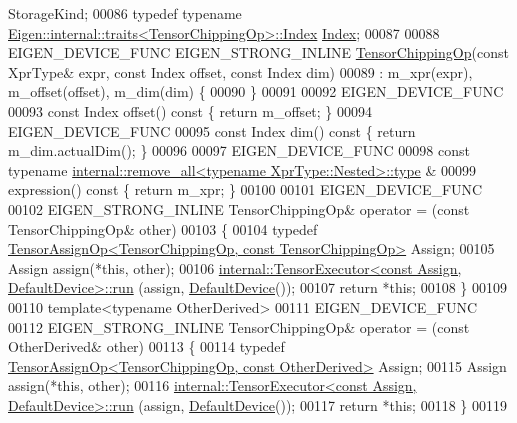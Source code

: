 \begin{DoxyCode}
       StorageKind;
00086   \textcolor{keyword}{typedef} \textcolor{keyword}{typename} \hyperlink{struct_eigen_1_1internal_1_1traits}{Eigen::internal::traits<TensorChippingOp>::Index}
       \hyperlink{namespace_eigen_a62e77e0933482dafde8fe197d9a2cfde}{Index};
00087 
00088   EIGEN\_DEVICE\_FUNC EIGEN\_STRONG\_INLINE \hyperlink{class_eigen_1_1_tensor_chipping_op}{TensorChippingOp}(\textcolor{keyword}{const} XprType& expr, \textcolor{keyword}{const} Index 
      offset, \textcolor{keyword}{const} Index dim)
00089       : m\_xpr(expr), m\_offset(offset), m\_dim(dim) \{
00090   \}
00091 
00092   EIGEN\_DEVICE\_FUNC
00093   \textcolor{keyword}{const} Index offset()\textcolor{keyword}{ const }\{ \textcolor{keywordflow}{return} m\_offset; \}
00094   EIGEN\_DEVICE\_FUNC
00095   \textcolor{keyword}{const} Index dim()\textcolor{keyword}{ const }\{ \textcolor{keywordflow}{return} m\_dim.actualDim(); \}
00096 
00097   EIGEN\_DEVICE\_FUNC
00098   \textcolor{keyword}{const} \textcolor{keyword}{typename} \hyperlink{group___sparse_core___module}{internal::remove\_all<typename XprType::Nested>::type}
      &
00099   expression()\textcolor{keyword}{ const }\{ \textcolor{keywordflow}{return} m\_xpr; \}
00100 
00101   EIGEN\_DEVICE\_FUNC
00102   EIGEN\_STRONG\_INLINE TensorChippingOp& operator = (\textcolor{keyword}{const} TensorChippingOp& other)
00103   \{
00104     \textcolor{keyword}{typedef} \hyperlink{class_eigen_1_1_tensor_assign_op}{TensorAssignOp<TensorChippingOp, const TensorChippingOp>}
       Assign;
00105     Assign assign(*\textcolor{keyword}{this}, other);
00106     \hyperlink{class_eigen_1_1internal_1_1_tensor_executor}{internal::TensorExecutor<const Assign, DefaultDevice>::run}
      (assign, \hyperlink{struct_eigen_1_1_default_device}{DefaultDevice}());
00107     \textcolor{keywordflow}{return} *\textcolor{keyword}{this};
00108   \}
00109 
00110   \textcolor{keyword}{template}<\textcolor{keyword}{typename} OtherDerived>
00111   EIGEN\_DEVICE\_FUNC
00112   EIGEN\_STRONG\_INLINE TensorChippingOp& operator = (\textcolor{keyword}{const} OtherDerived& other)
00113   \{
00114     \textcolor{keyword}{typedef} \hyperlink{class_eigen_1_1_tensor_assign_op}{TensorAssignOp<TensorChippingOp, const OtherDerived>}
       Assign;
00115     Assign assign(*\textcolor{keyword}{this}, other);
00116     \hyperlink{class_eigen_1_1internal_1_1_tensor_executor}{internal::TensorExecutor<const Assign, DefaultDevice>::run}
      (assign, \hyperlink{struct_eigen_1_1_default_device}{DefaultDevice}());
00117     \textcolor{keywordflow}{return} *\textcolor{keyword}{this};
00118   \}
00119 

\end{DoxyCode}
